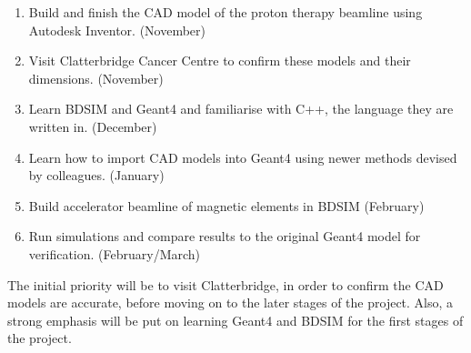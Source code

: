 \documentclass[a4paper, 12pt, conference]
{ieeeconf}      %
\begin{document}
\begin{enumerate}
    \item Build and finish the CAD model of the proton therapy beamline using Autodesk Inventor. (November)
	\item Visit Clatterbridge Cancer Centre to confirm these models and their dimensions. (November)
	\item Learn BDSIM and Geant4 and familiarise with C++, the language they are written in. (December)
	\item Learn how to import CAD models into Geant4 using newer methods devised by colleagues. (January)
	\item Build accelerator beamline of magnetic elements in BDSIM (February)
    \item Run simulations and compare results to the original Geant4 model for verification. (February/March)
\end{enumerate}

The initial priority will be to visit Clatterbridge, in order to confirm the CAD models are accurate, before moving on to the later stages of the project. Also, a strong emphasis will be put on learning Geant4 and BDSIM for the first stages of the project.





\addtolength{\textheight}{-12cm}   %

















\end{document}
